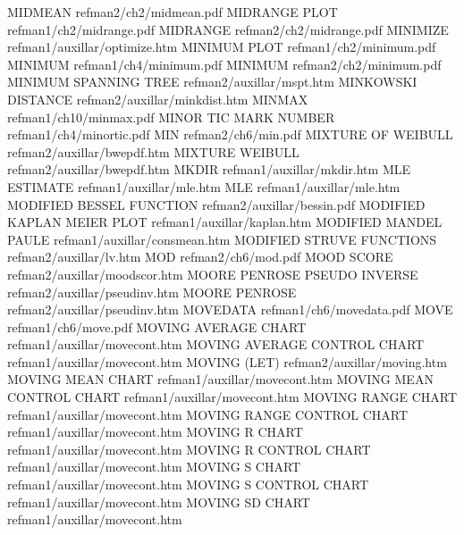 MIDMEAN                                 refman2/ch2/midmean.pdf
MIDRANGE PLOT                           refman1/ch2/midrange.pdf
MIDRANGE                                refman2/ch2/midrange.pdf
MINIMIZE                                refman1/auxillar/optimize.htm
MINIMUM PLOT                            refman1/ch2/minimum.pdf
MINIMUM                                 refman1/ch4/minimum.pdf
MINIMUM                                 refman2/ch2/minimum.pdf
MINIMUM SPANNING TREE                   refman2/auxillar/mspt.htm
MINKOWSKI DISTANCE                      refman2/auxillar/minkdist.htm
MINMAX                                  refman1/ch10/minmax.pdf
MINOR TIC MARK NUMBER                   refman1/ch4/minortic.pdf
MIN                                     refman2/ch6/min.pdf
MIXTURE OF WEIBULL                      refman2/auxillar/bwepdf.htm
MIXTURE WEIBULL                         refman2/auxillar/bwepdf.htm
MKDIR                                   refman1/auxillar/mkdir.htm
MLE ESTIMATE                            refman1/auxillar/mle.htm
MLE                                     refman1/auxillar/mle.htm
MODIFIED BESSEL FUNCTION                refman2/auxillar/bessin.pdf
MODIFIED KAPLAN MEIER PLOT              refman1/auxillar/kaplan.htm
MODIFIED MANDEL PAULE                   refman1/auxillar/consmean.htm
MODIFIED STRUVE FUNCTIONS               refman2/auxillar/lv.htm
MOD                                     refman2/ch6/mod.pdf
MOOD SCORE                              refman2/auxillar/moodscor.htm
MOORE PENROSE PSEUDO INVERSE            refman2/auxillar/pseudinv.htm
MOORE PENROSE                           refman2/auxillar/pseudinv.htm
MOVEDATA                                refman1/ch6/movedata.pdf
MOVE                                    refman1/ch6/move.pdf
MOVING AVERAGE CHART                    refman1/auxillar/movecont.htm
MOVING AVERAGE CONTROL CHART            refman1/auxillar/movecont.htm
MOVING (LET)                            refman2/auxillar/moving.htm
MOVING MEAN CHART                       refman1/auxillar/movecont.htm
MOVING MEAN CONTROL CHART               refman1/auxillar/movecont.htm
MOVING RANGE CHART                      refman1/auxillar/movecont.htm
MOVING RANGE CONTROL CHART              refman1/auxillar/movecont.htm
MOVING R CHART                          refman1/auxillar/movecont.htm
MOVING R CONTROL CHART                  refman1/auxillar/movecont.htm
MOVING S CHART                          refman1/auxillar/movecont.htm
MOVING S CONTROL CHART                  refman1/auxillar/movecont.htm
MOVING SD CHART                         refman1/auxillar/movecont.htm
